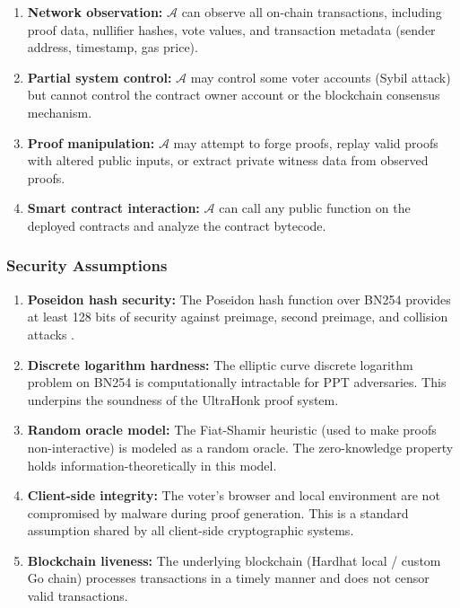 \documentclass[12pt, a4paper]{report}
\begin{document}
\begin{enumerate}
    \item \textbf{Network observation:} $\mathcal{A}$ can observe all on-chain transactions, including proof data, nullifier hashes, vote values, and transaction metadata (sender address, timestamp, gas price).
    
    \item \textbf{Partial system control:} $\mathcal{A}$ may control some voter accounts (Sybil attack) but cannot control the contract owner account or the blockchain consensus mechanism.
    
    \item \textbf{Proof manipulation:} $\mathcal{A}$ may attempt to forge proofs, replay valid proofs with altered public inputs, or extract private witness data from observed proofs.
    
    \item \textbf{Smart contract interaction:} $\mathcal{A}$ can call any public function on the deployed contracts and analyze the contract bytecode.
\end{enumerate}

\subsubsection{Security Assumptions}

\begin{enumerate}
    \item \textbf{Poseidon hash security:} The Poseidon hash function over BN254 provides at least 128 bits of security against preimage, second preimage, and collision attacks \cite{grassi2021poseidon}.
    
    \item \textbf{Discrete logarithm hardness:} The elliptic curve discrete logarithm problem on BN254 is computationally intractable for PPT adversaries. This underpins the soundness of the UltraHonk proof system.
    
    \item \textbf{Random oracle model:} The Fiat-Shamir heuristic (used to make proofs non-interactive) is modeled as a random oracle. The zero-knowledge property holds information-theoretically in this model.
    
    \item \textbf{Client-side integrity:} The voter's browser and local environment are not compromised by malware during proof generation. This is a standard assumption shared by all client-side cryptographic systems.
    
    \item \textbf{Blockchain liveness:} The underlying blockchain (Hardhat local / custom Go chain) processes transactions in a timely manner and does not censor valid transactions.
\end{enumerate}
\end{document}
